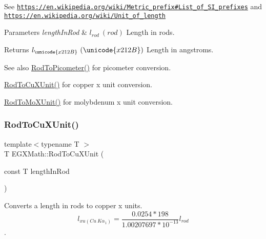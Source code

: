 See \href{https://en.wikipedia.org/wiki/Metric_prefix#List_of_SI_prefixes}{\tt https\+://en.\+wikipedia.\+org/wiki/\+Metric\+\_\+prefix\#\+List\+\_\+of\+\_\+\+S\+I\+\_\+prefixes} and \href{https://en.wikipedia.org/wiki/Unit_of_length}{\tt https\+://en.\+wikipedia.\+org/wiki/\+Unit\+\_\+of\+\_\+length} 
\begin{DoxyParams}{Parameters}
{\em length\+In\+Rod} & $ l_{rod}\ (rod)$ Length in rods. \\
\hline
\end{DoxyParams}
\begin{DoxyReturn}{Returns}
$ l_{\unicode{x212B}}\ (\unicode{x212B})$ Length in angstroms. 
\end{DoxyReturn}
\begin{DoxySeeAlso}{See also}
\mbox{\hyperlink{group___e_g_x_math-_conversions-_length_conversions-_surveyors-_rod-_s_i_ga212e66c6922a0df85714ec8559af8790}{Rod\+To\+Picometer()}} for picometer conversion. 

\mbox{\hyperlink{group___e_g_x_math-_conversions-_length_conversions-_surveyors-_rod-_non-_s_i_gac344dc1fbafaa0451704947bf33a8594}{Rod\+To\+Cu\+X\+Unit()}} for copper x unit conversion. 

\mbox{\hyperlink{group___e_g_x_math-_conversions-_length_conversions-_surveyors-_rod-_non-_s_i_gac5c3c27eea891ef32353d16c6b8c57ab}{Rod\+To\+Mo\+X\+Unit()}} for molybdenum x unit conversion. 
\end{DoxySeeAlso}
\mbox{\label{group___e_g_x_math-_conversions-_length_conversions-_surveyors-_rod-_non-_s_i_gac344dc1fbafaa0451704947bf33a8594}} 
\subsubsection{\texorpdfstring{Rod\+To\+Cu\+X\+Unit()}{RodToCuXUnit()}}
{\footnotesize\ttfamily template$<$typename T $>$ \\
T E\+G\+X\+Math\+::\+Rod\+To\+Cu\+X\+Unit (\begin{DoxyParamCaption}\item[{const T}]{length\+In\+Rod }\end{DoxyParamCaption})}



Converts a length in rods to copper x units. \[ l_{xu(Cu\ K\alpha_1)}=\frac{0.0254 * 198}{1.00207697*10^{-13}} l_{rod}\]. 


